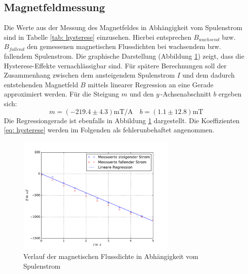 \subsection{Magnetfeldmessung}
Die Werte aus der Messung des Magnetfeldes in Abhängigkeit vom Spulenstrom sind in Tabelle \ref{tab: hysterese} einzusehen.
Hierbei entsprechen $B_{wachsend}$ bzw. $B_{fallend}$ den gemessenen magnetischen Flussdichten bei wachsendem
bzw. fallendem Spulenstrom.
Die graphische Darstellung (Abbildung \ref{fig: hysterese}) zeigt, dass die Hysterese-Effekte vernachlässigbar sind. Für
spätere Berechnungen soll der Zusammenhang zwischen dem ansteigendem Spulenstrom $I$ und dem dadurch entstehenden
Magnetfeld $B$ mittels linearer Regression an eine Gerade approximiert werden. Für die Steigung $m$ und den $y\,$-Achsenabschnitt $b$ ergeben sich:
\begin{equation}
  m = (-219.4 \pm 4.3) \si{\milli\tesla \per \ampere} \quad b =  (1.1 \pm 12.8) \si{\milli\tesla}%
  \label{eq: hysterese}
\end{equation}
Die Regressiongerade ist ebenfalls in Abbildung \ref{fig: hysterese} dargestellt. Die Koeffizienten \eqref{eq: hysterese} werden im Folgenden
als fehlerunbehaftet angenommen.
\begin{figure}
  \centering
  \includegraphics[width=0.7\textwidth]{pics/hysterese.pdf}
  \caption{Verlauf der magnetischen Flussdichte in Abhängigkeit vom Spulenstrom}
  \label{fig: hysterese}
\end{figure}




